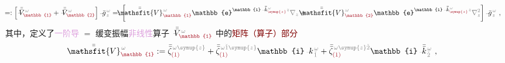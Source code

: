 \begin{subequations}
\begin{align}
	\!\!\! &=: \left[ \Xint{\mathcolor{gray}{-}}{25}{\bar{\bar{V}}}^{\;\! \mathcolor{gray}{\omega}}_{\textcolor{Maroon}{\mathbb{1}}} + \Xint{\mathcolor{gray}{-}}{25}{\bar{\bar{V}}}^{\;\! \mathcolor{gray}{\omega}}_{\textcolor{Maroon}{\mathbb{2}}} \right] \Xint{{}^{}_{\mathcolor{gray}{-}}}{10}{\bar{g}}^{\;\!\mathcolor{gray}{\omega}}_{\;\! \mathcolor{gray}{z}} =: \left[ \Xint{\mathcolor{gray}{-}}{25}{\bar{\bar{\mathsfit{V}}}}^{\;\! \mathcolor{gray}{\omega}}_{\textcolor{Maroon}{\mathbb{1}}} \mathbb{e}^{\mathbb{i} \Xint{\begin{smallmatrix} ~ \\ {}^{}_{\mathcolor{gray}{-}} \\ ~ \end{smallmatrix}}{15}{\bar{\bar{k}}}_{\textcolor{Maroon}{\symup{z}}}^{\;\! \mathcolor{gray}{\omega}} \mathcolor{gray}{z}} \mathcolor{gray}{\nabla_z} + \Xint{\mathcolor{gray}{-}}{25}{\bar{\bar{\mathsfit{V}}}}^{\;\! \mathcolor{gray}{\omega}}_{\textcolor{Maroon}{\mathbb{2}}} \mathbb{e}^{\mathbb{i} \Xint{\begin{smallmatrix} ~ \\ {}^{}_{\mathcolor{gray}{-}} \\ ~ \end{smallmatrix}}{15}{\bar{\bar{k}}}_{\textcolor{Maroon}{\symup{z}}}^{\;\! \mathcolor{gray}{\omega}} \mathcolor{gray}{z}} \mathcolor{gray}{\nabla_z^2} \right] \Xint{{}^{}_{\mathcolor{gray}{-}}}{10}{\bar{g}}^{\;\!\mathcolor{gray}{\omega}}_{\;\! \mathcolor{gray}{z}} ~, \label{eq:matrix_exp_eq-left_V-1st2nd-decompose}
\end{align}
\end{subequations}
其中，定义了\textcolor{Plum}{一阶导} $=$ \textcolor{NavyBlue}{缓变振幅}\textcolor{Plum}{非线性}算子 $\Xint{\mathcolor{gray}{-}}{21}{\bar{\bar{V}}}^{\;\! \mathcolor{gray}{\omega}}_{\textcolor{Maroon}{\mathbb{1}}}$ 中的\textcolor{Maroon}{矩阵（算子）部分}
\begin{align} \label{eq:matrix_exp-V1}
	\Xint{\mathcolor{gray}{-}}{25}{\bar{\bar{\mathsfit{V}}}}^{\;\! \mathcolor{gray}{\omega}}_{\textcolor{Maroon}{\mathbb{1}}} := \bar{\bar{\zeta}}^{\;\! \mathcolor{gray}{\omega} \mathcolor{gray}{\symup{z}}}_{\textcolor{Maroon}{(1)}} + \bar{\bar{\zeta}}^{\;\! \mathcolor{gray}{\omega} \mathcolor{gray}{\check{1} \symup{z}}}_{\textcolor{Maroon}{(1)}} \mathbb{i} \Xint{\begin{smallmatrix} ~ \\ {}^{}_{\mathcolor{gray}{-}} \\ ~ \end{smallmatrix}}{15}{k}_{\;\! \mathcolor{gray}{\check{1}}}^{\;\! \mathcolor{gray}{\omega}} + \bar{\bar{\zeta}}^{\;\! \mathcolor{gray}{\omega} \mathcolor{gray}{\symup{z} \check{2}}}_{\textcolor{Maroon}{(1)}} \mathbb{i} \Xint{\begin{smallmatrix} ~ \\ {}^{}_{\mathcolor{gray}{-}} \\ ~ \end{smallmatrix}}{15}{\bar{\bar{k}}}_{\;\! \mathcolor{gray}{\check{2}}}^{\;\! \mathcolor{gray}{\omega}} ~, 
\end{align}
